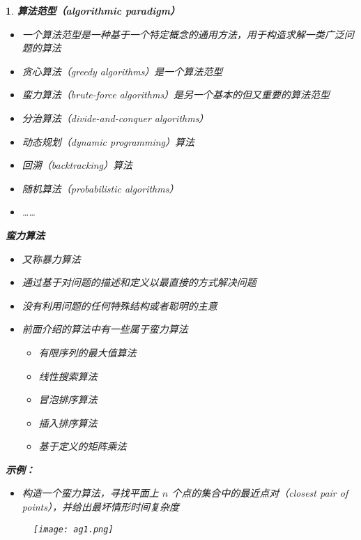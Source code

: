 \documentclass[UTF8]{report}
\theoremstyle{MyLineTheoremStyle} %
\theoremstyle{MyBlockTheoremStyle} %
\theoremstyle{MySubsubsectionStyle} %
\newtheorem{definition}{}
\begin{document}
\begin{definition}
    \textbf{算法范型（algorithmic paradigm）}
    \begin{itemize}
        \item 一个算法范型是一种基于一个特定概念的通用方法，用于构造求解一类广泛问题的算法
        \item 贪心算法（greedy algorithms）是一个算法范型
        \item 蛮力算法（brute-force algorithms）是另一个基本的但又重要的算法范型
        \item 分治算法（divide-and-conquer algorithms）
        \item 动态规划（dynamic programming）算法
        \item 回溯（backtracking）算法
        \item 随机算法（probabilistic algorithms）
        \item ……
    \end{itemize}

    \textbf{蛮力算法}
    \begin{itemize}
        \item 又称暴力算法
        \item 通过基于对问题的描述和定义以最直接的方式解决问题
        \item 没有利用问题的任何特殊结构或者聪明的主意
        \item 前面介绍的算法中有一些属于蛮力算法
        \begin{itemize}
            \item 有限序列的最大值算法
            \item 线性搜索算法
            \item 冒泡排序算法
            \item 插入排序算法
            \item 基于定义的矩阵乘法
        \end{itemize}
    \end{itemize}

    \textbf{示例：}
    \begin{itemize}
        \item 构造一个蛮力算法，寻找平面上 $n$ 个点的集合中的最近点对（closest pair of points），并给出最坏情形时间复杂度
    \end{itemize}

    \begin{figure}[ht]
        \centering
        \texttt{[image: ag1.png]}
    \end{figure}


\end{definition}
\end{document}
